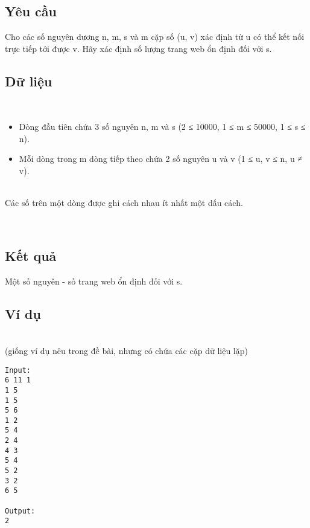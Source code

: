 \subsection{Yêu cầu}

Cho các số nguyên dương n, m, s và m cặp số (u, v) xác định từ u có thể kết nối trực tiếp tới được v. Hãy xác định số lượng trang web ổn định đối với s.

\subsection{Dữ liệu}

 
\begin{itemize}
	\item Dòng đầu tiên chứa 3 số nguyên n, m và s (2 ≤ 10000, 1 ≤ m ≤ 50000, 1 ≤ s ≤ n).
	\item Mỗi dòng trong m dòng tiếp theo chứa 2 số nguyên u và v (1 ≤ u, v ≤ n, u ≠ v).
\end{itemize}


\\Các số trên một dòng được ghi cách nhau ít nhất một dấu cách.

 

\subsection{Kết quả}

Một số nguyên - số trang web ổn định đối với s.

\subsection{Ví dụ}


\\(giống ví dụ nêu trong đề bài, nhưng có chứa các cặp dữ liệu lặp)
\begin{verbatim}
Input:
6 11 1
1 5
1 5
5 6
1 2
5 4
2 4
4 3
5 4
5 2
3 2
6 5

Output:
2
\end{verbatim}
